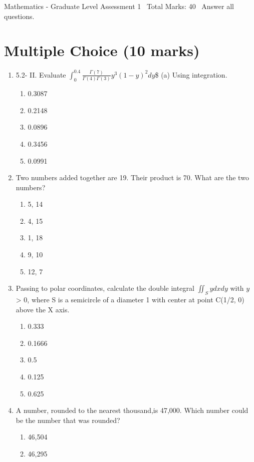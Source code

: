 \documentclass[12pt]{article}
\begin{document}
\begin{center}
Mathematics - Graduate Level Assessment 1 \
Total Marks: 40 \
Answer all questions.
\end{center}

\section*{Multiple Choice (10 marks)}
\begin{enumerate}[label=\arabic*.]
\item 5.2- II. Evaluate $ \int_0^{0.4} \frac{\Gamma(7)}{\Gamma(4) \Gamma(3)} y^3(1-y)^2 d y $\$
(a) Using integration.
\begin{enumerate}[label=(\alph*)]
    \item 0.3087
    \item 0.2148
    \item 0.0896
    \item 0.3456
    \item 0.0991
\end{enumerate}
\item Two numbers added together are 19. Their product is 70. What are the two numbers?
\begin{enumerate}[label=(\alph*)]
    \item 5, 14
    \item 4, 15
    \item 1, 18
    \item 9, 10
    \item 12, 7
\end{enumerate}
\item Passing to polar coordinates, calculate the double integral $\iint_S ydxdy$ with $y$ \textgreater{} 0,
where S is a semicircle of a diameter 1 with center at point C(1/2, 0) above the X axis.
\begin{enumerate}[label=(\alph*)]
    \item 0.333
    \item 0.1666
    \item 0.5
    \item 0.125
    \item 0.625
\end{enumerate}
\item A number, rounded to the nearest thousand,is 47,000. Which number could be the number that
was rounded?
\begin{enumerate}[label=(\alph*)]
    \item 46,504
    \item 46,295

\end{enumerate}
\end{enumerate}
\end{document}
